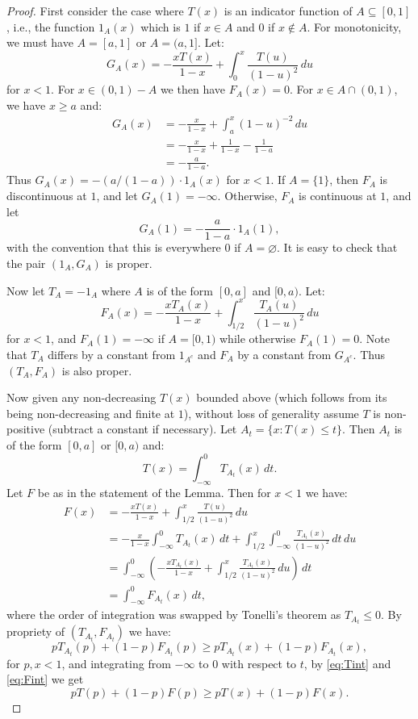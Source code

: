 \begin{proof}
First consider the case where $T(x)$ is an indicator function of $A\subseteq [0,1]$, i.e., the function 
 $1_A(x)$ which is $1$ if
$x\in A$ and $0$ if $x\notin A$. For monotonicity, we must have $A=[a,1]$ or $A=(a,1]$. Let:
$$
	G_A(x) = -\frac{xT(x)}{1-x}+\int_0^x \frac{T(u)}{(1-u)^2} \, du
$$
for $x<1$. For $x \in (0,1)-A$ we then have $F_A(x)=0$. For $x \in A\cap (0,1)$, we have $x\ge a$ and:
$$
\begin{aligned}
	G_A(x) &= -\frac{x}{1-x}+\int_a^x (1-u)^{-2} \,du \\
		 &= -\frac{x}{1-x}+\frac{1}{1-x}-\frac{1}{1-a} \\
		 &= -\frac{a}{1-a}.
\end{aligned}
$$		 
Thus $G_A(x) = -(a/(1-a))\cdot 1_A(x)$ for $x<1$. If $A=\{ 1 \}$, then $F_A$ is discontinuous at $1$,
and let $G_A(1)=-\infty$. Otherwise, $F_A$ is continuous at $1$, and let
$$
    G_A(1)=-\frac{a}{1-a}\cdot 1_A(1),
$$
with the convention that this is everywhere $0$ if $A=\varnothing$. It is easy to check that the pair
$(1_A,G_A)$ is proper.

Now let $T_A = -1_A$ where $A$ is of the form $[0,a]$ and $[0,a)$. Let:
$$
	F_A(x) = -\frac{xT_A(x)}{1-x}+\int_{1/2}^x \frac{T_A(u)}{(1-u)^2} \, du
$$
for $x<1$, and $F_A(1)=-\infty$ if $A=[0,1)$ while otherwise $F_A(1)=0$.
Note that $T_A$ differs by a constant from $1_{A^c}$ and $F_A$ by a constant from $G_{A^c}$. Thus
$(T_A,F_A)$ is also proper.

Now given any non-decreasing $T(x)$ bounded above (which follows from its being non-decreasing and finite
at $1$), without loss of generality assume $T$ is non-positive
(subtract a constant if necessary). Let $A_t=\{ x : T(x) \le t \}$. Then $A_t$ is of the form 
$[0,a]$ or $[0,a)$ and:
\begin{equation}\label{eq:Tint}
	T(x) = \int_{-\infty}^0 T_{A_t}(x) \, dt.
\end{equation}
Let $F$ be as in the statement of the Lemma. Then for $x<1$ we have:
\begin{equation}\label{eq:Fint}
\begin{aligned}
	F(x) &= -\frac{xT(x)}{1-x}+\int_{1/2}^x \frac{T(u)}{(1-u)^2} \, du \\
		 &= -\frac{x}{1-x}\int_{-\infty}^0 T_{A_t}(x) \, dt + \int_{1/2}^x \int_{-\infty}^0 \frac{T_{A_t}(x)}{(1-u)^2} \, dt\, du \\
		 &= \int_{-\infty}^0 \left(-\frac{xT_{A_t}(x)}{1-x}  + \int_{1/2}^x \frac{T_{A_t}(x)}{(1-u)^2} \, du \right) \, dt\\
		 &= \int_{-\infty}^0 F_{A_t}(x) \, dt,
\end{aligned}		 
\end{equation}
where the order of integration was swapped by Tonelli's theorem as $T_{A_t}\le 0$. By propriety of
$(T_{A_t},F_{A_t})$ we have:
$$
	p T_{A_t}(p) + (1-p) F_{A_t}(p) \ge 
	p T_{A_t}(x) + (1-p) F_{A_t}(x),
$$
for $p,x<1$, 
and integrating from $-\infty$ to $0$ with respect to $t$, by \eqref{eq:Tint} and \eqref{eq:Fint} we get
\begin{equation}\label{eq:propriety}
	p T(p) + (1-p) F(p) \ge 
	p T(x) + (1-p) F(x).
\end{equation}


\end{proof}

